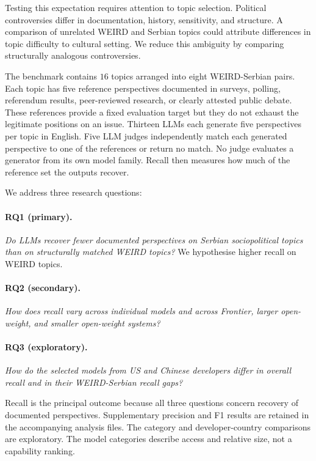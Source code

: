 \documentclass[11pt,a4paper]{article}
\begin{document}
Testing this expectation requires attention to topic selection. Political controversies differ in documentation, history, sensitivity, and structure. A comparison of unrelated WEIRD and Serbian topics could attribute differences in topic difficulty to cultural setting. We reduce this ambiguity by comparing structurally analogous controversies.

The benchmark contains $16$ topics arranged into eight WEIRD-Serbian pairs. Each topic has five reference perspectives documented in surveys, polling, referendum results, peer-reviewed research, or clearly attested public debate. These references provide a fixed evaluation target but they do not exhaust the legitimate positions on an issue. Thirteen LLMs each generate five perspectives per topic in English. Five LLM judges independently match each generated perspective to one of the references or return no match. No judge evaluates a generator from its own model family. Recall then measures how much of the reference set the outputs recover.

We address three research questions:

\paragraph{RQ1 (primary).}
\textit{Do LLMs recover fewer documented perspectives on Serbian sociopolitical topics than on structurally matched WEIRD topics?} We hypothesise higher recall on WEIRD topics.

\paragraph{RQ2 (secondary).}
\textit{How does recall vary across individual models and across Frontier, larger open-weight, and smaller open-weight systems?}

\paragraph{RQ3 (exploratory).}
\textit{How do the selected models from US and Chinese developers differ in overall recall and in their WEIRD-Serbian recall gaps?}

Recall is the principal outcome because all three questions concern recovery of documented perspectives. Supplementary precision and F1 results are retained in the accompanying analysis files. The category and developer-country comparisons are exploratory. The model categories describe access and relative size, not a capability ranking.
\end{document}
